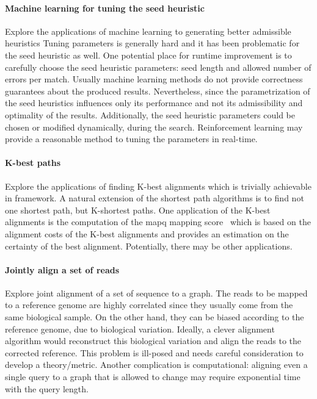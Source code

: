 \paragraph{Machine learning for tuning the seed heuristic}
Explore the applications of machine learning to generating better admissible
heuristics Tuning parameters is generally hard and it has been problematic for
the seed heuristic as well. One potential place for runtime improvement is to
carefully choose the seed heuristic parameters: seed length and allowed number
of errors per match. Usually machine learning methods do not provide correctness
guarantees about the produced results. Nevertheless, since the parametrization
of the seed heuristics influences only its performance and not its admissibility
and optimality of the results. Additionally, the seed heuristic parameters could
be chosen or modified dynamically, during the \A search. Reinforcement learning
may provide a reasonable method to tuning the parameters in real-time.

\paragraph{K-best paths}
Explore the applications of finding K-best alignments which is trivially
achievable in \A framework. A natural extension of the shortest path algorithms
is to find not one shortest path, but K-shortest paths. One application of the
K-best alignments is the computation of the mapq mapping
score~\citep{li2008mapping} which is based on the alignment costs of the K-best
alignments and provides an estimation on the certainty of the best alignment.
Potentially, there may be other applications.

\paragraph{Jointly align a set of reads}
Explore joint alignment of a set of sequence to a graph. The reads to be mapped
to a reference genome are highly correlated since they usually come from the
same biological sample. On the other hand, they can be biased according to the
reference genome, due to biological variation. Ideally, a clever alignment
algorithm would reconstruct this biological variation and align the reads to the
corrected reference. This problem is ill-posed and needs careful consideration
to develop a theory/metric. Another complication is computational: aligning even
a single query to a graph that is allowed to change may require exponential time
with the query length.

